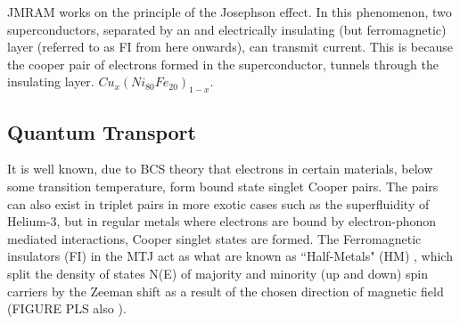 \documentclass[12pt]{article}
\begin{document}
JMRAM works on the principle of the Josephson effect. In this phenomenon, two superconductors, separated by an and electrically insulating (but ferromagnetic) layer (referred to as FI from here onwards), can transmit current. This is because the cooper pair of electrons formed in the superconductor, tunnels through the insulating layer. $Cu_x(Ni_80Fe_20)_{1-x}$. 



\subsection{Quantum Transport}

It is well known, due to BCS theory \cite{BCS} that electrons in certain materials, below some transition temperature, form bound state singlet Cooper pairs. The pairs can also exist in triplet pairs in more exotic cases such as the superfluidity of Helium-3, but in regular metals where electrons are bound by electron-phonon mediated interactions, Cooper singlet states are formed. The Ferromagnetic insulators (FI) in the MTJ act as what are known as ``Half-Metals" (HM) \cite{HM}, which split the density of states N(E) of majority and minority (up and down) spin carriers by the Zeeman shift as a result of the chosen direction of magnetic field (FIGURE PLS also \cite{HM}). 
\end{document}
